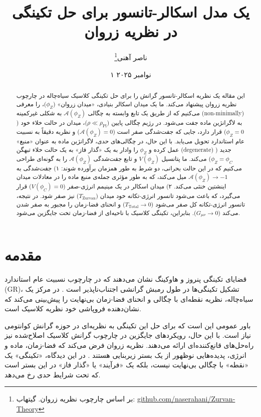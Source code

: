 \documentclass[12pt, a4paper]{article}
\title{یک مدل اسکالر-تانسور برای حل تکینگی در نظریه زروان}
\author{ناصر آهنی\thanks{بر اساس چارچوب نظریه زروان. گیتهاب: \href{https://github.com/naserahani/Zurvan-Theory}{github.com/naserahani/Zurvan-Theory}}}
\date{۱ نوامبر ۲۰۲۵} %
\newcommand{\phiZ}{\phi_Z}
\newcommand{\Tzurvan}{T_{\text{Zurvan}}}
\newcommand{\Ttotal}{T_{\text{Total}}}
\newcommand{\Aphi}{\mathcal{A}(\phiZ)}
\newcommand{\Vphi}{V(\phiZ)}
\newcommand{\phiC}{\phi_C}
\newcommand{\rhopl}{\rho_{\text{Pl}}}
\begin{document}

\maketitle %

\begin{abstract}
این مقاله یک نظریه اسکالر-تانسور گرانش را برای حل تکینگی کلاسیک سیاه‌چاله در چارچوب نظریه زروان پیشنهاد می‌کند. ما یک میدان اسکالر بنیادی، «میدان زروان» ($\phiZ$)، را معرفی می‌کنیم که از طریق یک تابع وابسته به چگالی $\Aphi$ به شکلی غیرکمینه (non-minimally) به لاگرانژین ماده جفت می‌شود. در رژیم چگالی پایین ($\rho \ll \rhopl$)، میدان در حالت خلاء خود ($\phiZ=0$) قرار دارد، جایی که جفت‌شدگی صفر است ($\Aphi=0$) و نظریه دقیقاً به نسبیت عام استاندارد تحویل می‌یابد. با این حال، در چگالی‌های حدی، لاگرانژین ماده به عنوان «منبع» عمل کرده و $\phiZ$ را وادار به یک «گذار فاز» به یک حالت خلاء تبهگن (degenerate) جدید ($\phiZ = \phiC$) می‌کند. ما پتانسیل $\Vphi$ و تابع جفت‌شدگی $\Aphi$ را به گونه‌ای طراحی می‌کنیم که در این حالت بحرانی، دو شرط به طور همزمان برآورده شوند: ۱) جفت‌شدگی به $\Aphi \to -1$ میل می‌کند، که به طور مؤثری جمله‌ی منبع ماده را در معادلات میدان اینشتین خنثی می‌کند. ۲) میدان اسکالر در یک مینیمم انرژی-صفر ($V(\phiC)=0$) قرار می‌گیرد، که باعث می‌شود تانسور انرژی-تکانه خود میدان ($\Tzurvan$) نیز صفر شود. در نتیجه، تانسور انرژی-تکانه کل صفر می‌شود ($\Ttotal \to 0$) و انحنای فضا-زمان را مجبور به صفر شدن می‌کند ($G_{\mu\nu} \to 0$). بنابراین، تکینگی کلاسیک با ناحیه‌ای از فضا-زمان تخت جایگزین می‌شود.
\end{abstract}

\newpage

\section{مقدمه}

قضایای تکینگی پنروز و هاوکینگ نشان می‌دهند که در چارچوب نسبیت عام استاندارد (GR)، تشکیل تکینگی‌ها در طول رمبش گرانشی اجتناب‌ناپذیر است \cite{penrose1965, hawking1970}. در مرکز یک سیاه‌چاله، نظریه نقطه‌ای با چگالی و انحنای فضا-زمان بی‌نهایت را پیش‌بینی می‌کند که نشان‌دهنده فروپاشی خود نظریه کلاسیک است.

باور عمومی این است که برای حل این تکینگی به نظریه‌ای در حوزه گرانش کوانتومی نیاز است. با این حال، رویکردهای جایگزین در چارچوب گرانش کلاسیک اصلاح‌شده نیز راه‌حل‌های قانع‌کننده‌ای ارائه می‌دهند. نظریه زروان فرض می‌کند که فضا-زمان، ماده و انرژی، پدیده‌هایی نوظهور از یک بستر زیربنایی هستند \cite{ahani_zurvan}. در این دیدگاه، «تکینگی» یک «نقطه» با چگالی بی‌نهایت نیست، بلکه یک «فرآیند» یا «گذار فاز» در این بستر است که تحت شرایط حدی رخ می‌دهد.
\end{document}
